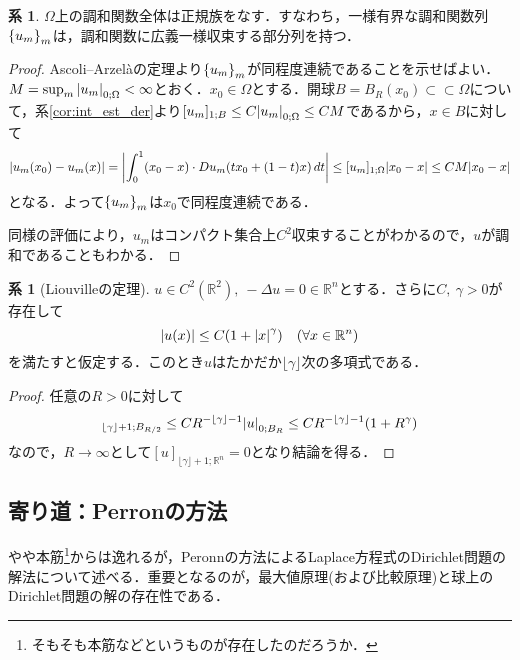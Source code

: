 \documentclass[a4paper]{ltjsarticle}
\newcommand{\Rset}{\mathbb{R}}
\newcommand{\Om}{\Omega}
\newcommand{\ssubset}{\subset\subset}
\newcommand{\1}{\mathbbm{1}}
\numberwithin{equation}{section}
\theoremstyle{definition}
\newtheorem{cor}[thm]{系}
\begin{document}
\begin{cor}\label{cor:normal_family}
    $\Om$上の調和関数全体は正規族をなす．すなわち，一様有界な調和関数列$\qty{u_m}_m$は，調和関数に広義一様収束する部分列を持つ．
\end{cor}
\begin{proof}
    Ascoli--Arzelàの定理より$\qty{u_m}_{m}$が同程度連続であることを示せばよい．$M=\sup_{m} \abs{u_m}_{0;\Om}<\infty$とおく．$x_0\in\Om$とする．開球$B=B_R(x_0)\ssubset \Om$について，系\ref{cor:int_est_der}より$[u_m]_{1;B}\leq C\abs{u_m}_{0;\Om}\leq CM$であるから，$x\in B$に対して
    \begin{equation}
        \abs{u_m(x_0)-u_m(x)}=\abs{\int_{0}^{1}(x_0-x)\cdot Du_m(tx_0+(1-t)x)\,dt}\leq [u_m]_{1;\Om}\abs{x_0-x}\leq CM\abs{x_0-x}
    \end{equation}
    となる．よって$\qty{u_m}_m$は$x_0$で同程度連続である．

    同様の評価により，$u_m$はコンパクト集合上$C^2$収束することがわかるので，$u$が調和であることもわかる．
\end{proof}
\begin{cor}[Liouvilleの定理]\label{cor:liouville}
    $u\in C^2(\Rset^2),\ -\Delta u=0\in \Rset^n$とする．さらに$C,\ \gamma>0$が存在して
    \begin{equation}
        \abs{u(x)}\leq C(1+\abs{x}^\gamma)\quad (\forall x\in\Rset^n)
    \end{equation}
    を満たすと仮定する．このとき$u$はたかだか$\lfloor \gamma\rfloor$次の多項式である．
\end{cor}
\begin{proof}
    任意の$R>0$に対して 
    \begin{equation}
        [u]_{\lfloor \gamma\rfloor+1;B_{R/2}}\leq CR^{-\lfloor \gamma\rfloor-1}\abs{u}_{0;B_R}\leq CR^{-\lfloor \gamma\rfloor-1}(1+R^{\gamma})
    \end{equation}
    なので，$R\to\infty$として$[u]_{\lfloor \gamma\rfloor+1;\Rset^n}=0$となり結論を得る．
\end{proof}
\subsection{寄り道：Perronの方法}
やや本筋\footnote{そもそも本筋などというものが存在したのだろうか．}からは逸れるが，Peronnの方法によるLaplace方程式のDirichlet問題の解法について述べる．重要となるのが，最大値原理(および比較原理)と球上のDirichlet問題の解の存在性である．
\end{document}
